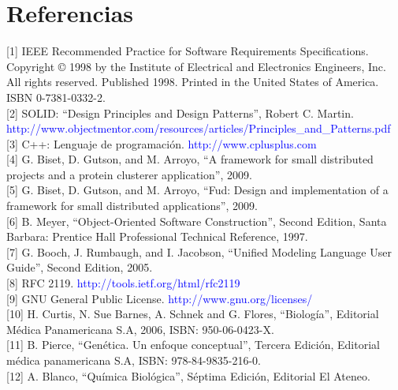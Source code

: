 \section{Referencias}
\label{appendix-ref}
[1] IEEE Recommended Practice for Software Requirements Specifications. Copyright © 1998 by the Institute of Electrical and Electronics Engineers, Inc. All rights reserved. Published 1998. Printed in the United States of America. ISBN 0-7381-0332-2. \\

[2] SOLID: ``Design Principles and Design Patterns'', Robert C. Martin. \textcolor{blue}{http://www.objectmentor.com/resources/articles/Principles\_and\_Patterns.pdf} \\

[3] C++: Lenguaje de programación. \textcolor{blue}{http://www.cplusplus.com} \\

[4] G. Biset, D. Gutson, and M. Arroyo, “A framework for small distributed projects and a protein clusterer application”, 2009. \\

[5] G. Biset, D. Gutson, and M. Arroyo, “Fud: Design and implementation of a framework for small distributed applications”, 2009. \\

[6] B. Meyer, “Object-Oriented Software Construction”, Second Edition, Santa Barbara: Prentice Hall Professional Technical Reference, 1997. \\

[7] G. Booch, J. Rumbaugh, and I. Jacobson, “Unified Modeling Language User Guide”, Second Edition, 2005. \\

[8] RFC 2119. \textcolor{blue}{http://tools.ietf.org/html/rfc2119} \\

[9] GNU General Public License. \textcolor{blue}{http://www.gnu.org/licenses/} \\

[10] H. Curtis, N. Sue Barnes, A. Schnek and G. Flores, “Biología”, Editorial Médica Panamericana S.A, 2006, ISBN: 950-06-0423-X. \\

[11] B. Pierce, “Genética. Un enfoque conceptual”, Tercera Edición, Editorial médica panamericana S.A, ISBN: 978-84-9835-216-0. \\

[12] A. Blanco, “Química Biológica”, Séptima Edición, Editorial El Ateneo. \\

